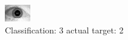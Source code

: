 \begin{figure}[h!]
\begin{center}
\includegraphics[width=0.60\columnwidth]{figures/ID1770_class_3_target_2.png}
\end{center}
\caption{ Classification: 3 actual target: 2}
\label{fig:ID1770_class_3_target_2}
\end{figure}
